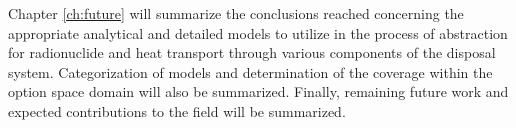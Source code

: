 
Chapter \ref{ch:future} will summarize the conclusions reached concerning the 
appropriate analytical and detailed models to utilize in the process of 
abstraction for radionuclide and heat transport through various components of 
the disposal system. Categorization of models and determination of the coverage 
within the option space domain will also be summarized. Finally, remaining 
future work and expected contributions to the field will be summarized. 


% 

